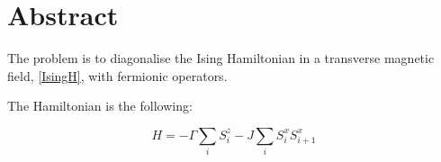 
{}
\section*{Abstract}
The problem is to diagonalise the Ising Hamiltonian in a transverse magnetic field, \cref{IsingH}, with fermionic operators.

The Hamiltonian is the following:

\begin{equation}
H = - \Gamma \sum_i S_i^z - J \sum_i S_i^x S_{i+1}^x
\label{IsingH}
\end{equation}

